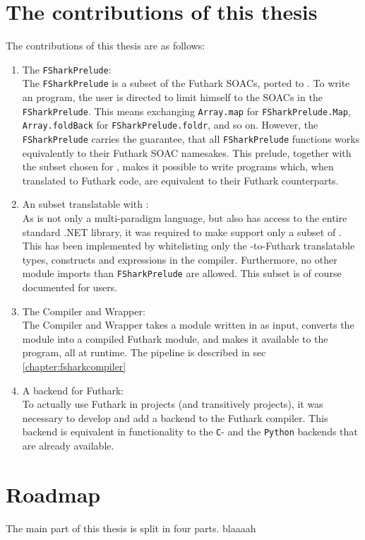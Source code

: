 \section*{The contributions of this thesis}
The contributions of this thesis are as follows:
\begin{enumerate}
\item The \texttt{FSharkPrelude}:\\
  The \texttt{FSharkPrelude} is a subset of the Futhark SOACs, ported to
  \fsharp{}. To write an \fshark{} program, the user is directed to limit
  himself to the SOACs in the \texttt{FSharkPrelude}. This means exchanging
  \texttt{Array.map} for \texttt{FSharkPrelude.Map}, \texttt{Array.foldBack} for
  \texttt{FSharkPrelude.foldr}, and so on.
  However, the \texttt{FSharkPrelude} carries the guarantee, that all
  \texttt{FSharkPrelude} functions works equivalently to their Futhark SOAC namesakes. 
  This prelude, together with the \fsharp{} subset chosen for \fshark{}, makes
  it possible to write \fsharp{} programs which, when translated to Futhark
  code, are equivalent to their Futhark counterparts.

\item An \fsharp{} subset translatable with \fshark{}:\\
  As \fsharp{} is not only a multi-paradigm language, but also has access to the
  entire standard .NET library, it was required to make \fshark{} support only a
  subset of \fsharp{}. This has been implemented by whitelisting only the
  \fsharp{}-to-Futhark translatable types, constructs and expressions in the \fshark{}
  compiler. Furthermore, no other module imports than \texttt{FSharkPrelude} are allowed. 
  This subset is of course documented for users.

\item The \fshark{} Compiler and Wrapper:\\
  The \fshark{} Compiler and Wrapper takes a module written in \fshark{} as
  input, converts the \fshark{} module into a compiled Futhark \csharp{} module,
  and makes it available to the \fsharp{} program, all at runtime.
  The pipeline is described in sec \ref{chapter:fsharkcompiler}

\item A \csharp{} backend for Futhark:\\
  To actually use Futhark in \csharp{} projects (and transitively \fsharp{}
  projects), it was necessary to develop and add a \csharp{} backend to
  the Futhark compiler. This backend is equivalent in functionality to
  the \texttt{C}- and the \texttt{Python} backends that are already available.

\end{enumerate}

\clearpage
\section*{Roadmap}
The main part of this thesis is split in four parts.
blaaaah


